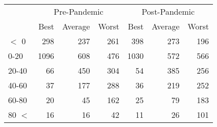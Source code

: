 
\begin{tabular}[t]{lrrrrrr}
\toprule
\multicolumn{1}{c}{ } & \multicolumn{3}{c}{Pre-Pandemic} & \multicolumn{3}{c}{Post-Pandemic} \\
\cmidrule(l{3pt}r{3pt}){2-4} \cmidrule(l{3pt}r{3pt}){5-7}
 & Best & Average & Worst & Best & Average & Worst\\
\midrule
$<$ 0 & 298 & 237 & 261 & 398 & 273 & 196\\
0-20 & 1096 & 608 & 476 & 1030 & 572 & 566\\
20-40 & 66 & 450 & 304 & 54 & 385 & 256\\
40-60 & 37 & 177 & 288 & 36 & 219 & 252\\
60-80 & 20 & 45 & 162 & 25 & 79 & 183\\
80 $<$ & 16 & 16 & 42 & 11 & 26 & 101\\
\bottomrule
\end{tabular}
